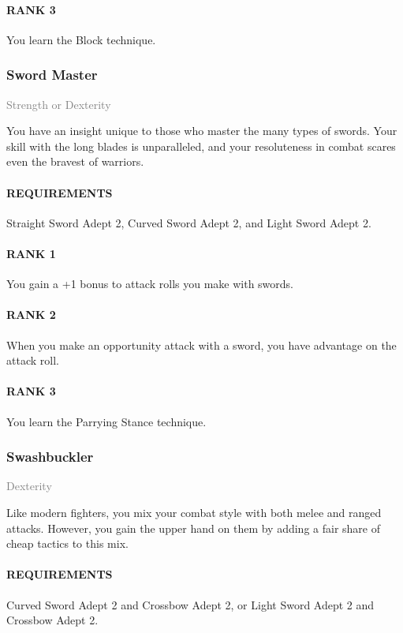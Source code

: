 \paragraph{RANK 3} You learn the Block technique.

\subsubsection{Sword Master} \label{feat::swordmaster}
\small{\textcolor{gray}{Strength or Dexterity}}

\normalsize
You have an insight unique to those who master the many types of swords.
Your skill with the long blades is unparalleled, and your resoluteness in combat scares even the bravest of warriors.
\paragraph{REQUIREMENTS} Straight Sword Adept 2, Curved Sword Adept 2, and Light Sword Adept 2.
\paragraph{RANK 1} You gain a +1 bonus to attack rolls you make with swords.
\paragraph{RANK 2} When you make an opportunity attack with a sword, you have advantage on the attack roll.
\paragraph{RANK 3} You learn the Parrying Stance technique.

\subsubsection{Swashbuckler} \label{feat::swashbuckler}
\small{\textcolor{gray}{Dexterity}}

\normalsize
Like modern fighters, you mix your combat style with both melee and ranged attacks.
However, you gain the upper hand on them by adding a fair share of cheap tactics to this mix.
\paragraph{REQUIREMENTS} Curved Sword Adept 2 and Crossbow Adept 2, or Light Sword Adept 2 and Crossbow Adept 2.
